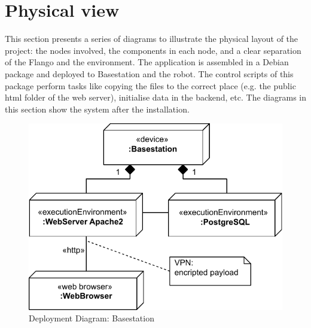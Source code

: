 \FloatBarrier

\section{Physical view}
This section presents a series of diagrams to illustrate the physical layout of the project: the nodes involved, the components in each node, and a clear separation of the Flango \cm and the environment.
The application is assembled in a Debian package and deployed to Basestation and the robot.
The control scripts of this package perform tasks like copying the files to the correct place (e.g. the public html folder of the web server), initialise data in the backend, etc.
The diagrams in this section show the system after the installation.

\begin{figure}[htb]
    \centering
    \includegraphics{figures/design-deployment-basestation.pdf}
    \caption{Deployment Diagram: Basestation}
    \label{fig:deploy-basestation}
\end{figure}

